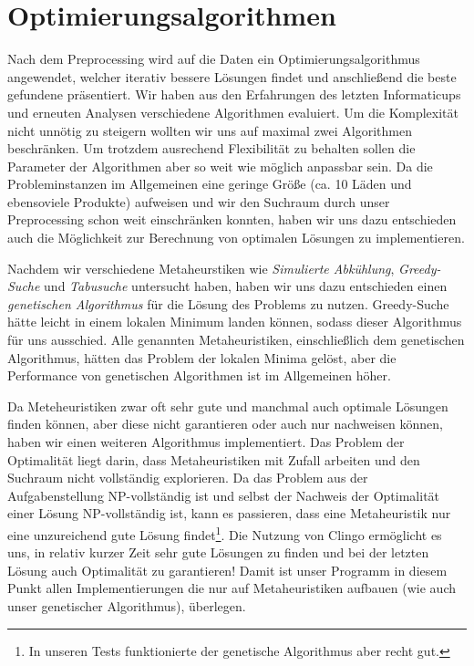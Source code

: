 ﻿\section{Optimierungsalgorithmen}

Nach dem Preprocessing wird auf die Daten ein Optimierungsalgorithmus angewendet, welcher iterativ bessere Lösungen findet und anschließend die beste gefundene präsentiert. Wir haben aus den Erfahrungen des letzten Informaticups und erneuten Analysen verschiedene Algorithmen evaluiert. Um die Komplexität nicht unnötig zu steigern wollten wir uns auf maximal zwei Algorithmen beschränken. Um trotzdem ausrechend Flexibilität zu behalten sollen die Parameter der Algorithmen aber so weit wie möglich anpassbar sein. Da die Probleminstanzen im Allgemeinen eine geringe Größe (ca. 10 Läden und ebensoviele Produkte) aufweisen und wir den Suchraum durch unser Preprocessing schon weit einschränken konnten, haben wir uns dazu entschieden auch die Möglichkeit zur Berechnung von optimalen Lösungen zu implementieren. 

Nachdem wir verschiedene Metaheurstiken wie \emph{Simulierte Abkühlung}, \emph{Greedy-Suche} und \emph{Tabusuche} untersucht haben, haben wir uns dazu entschieden einen \emph{genetischen Algorithmus} für die Lösung des Problems zu nutzen. Greedy-Suche hätte leicht in einem lokalen Minimum landen können, sodass dieser Algorithmus für uns ausschied. Alle genannten Metaheuristiken, einschließlich dem genetischen Algorithmus, hätten das Problem der lokalen Minima gelöst, aber die Performance von genetischen Algorithmen ist im Allgemeinen höher. 

Da Meteheuristiken zwar oft sehr gute und manchmal auch optimale Lösungen finden können, aber diese nicht garantieren oder auch nur nachweisen können, haben wir einen weiteren Algorithmus implementiert. Das Problem der Optimalität liegt darin, dass Metaheuristiken mit Zufall arbeiten und den Suchraum nicht vollständig explorieren. Da das Problem aus der Aufgabenstellung NP-vollständig ist und selbst der Nachweis der Optimalität einer Lösung NP-vollständig ist, kann es passieren, dass eine Metaheuristik nur eine unzureichend gute Lösung findet\footnote{In unseren Tests funktionierte der genetische Algorithmus aber recht gut.}. Die Nutzung von Clingo ermöglicht es uns, in relativ kurzer Zeit sehr gute Lösungen zu finden und bei der letzten Lösung auch Optimalität zu garantieren! Damit ist unser Programm in diesem Punkt allen Implementierungen die nur auf Metaheuristiken aufbauen (wie auch unser genetischer Algorithmus), überlegen.

